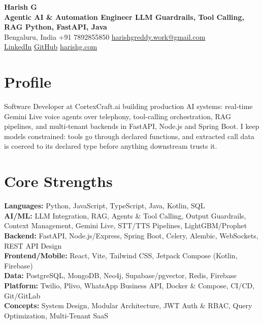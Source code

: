 \documentclass[10pt,a4paper]{article}
\begin{document}
{\LARGE\bfseries Harish G}\\[1pt]
{\normalsize\bfseries Agentic AI \& Automation Engineer \textbar{} LLM Guardrails, Tool Calling, RAG \textbar{} Python, FastAPI, Java}\\[2pt]
Bengaluru, India \quad\textbar\quad +91 7892855850 \quad\textbar\quad
\href{mailto:harishgreddy.work@gmail.com}{harishgreddy.work@gmail.com}\\[1pt]
\href{https://www.linkedin.com/in/harishgreddy/}{LinkedIn} \quad\textbar\quad \href{https://github.com/harish00506/}{GitHub} \quad\textbar\quad \href{https://www.harishg.com}{harishg.com}

\section{Profile}
Software Developer at CortexCraft.ai building production AI systems: real-time Gemini Live voice agents
over telephony, tool-calling orchestration, RAG pipelines, and multi-tenant backends in FastAPI, Node.js
and Spring Boot. I keep models constrained: tools go through declared functions, and extracted call data
is coerced to its declared type before anything downstream trusts it.

\section{Core Strengths}
\textbf{Languages:} Python, JavaScript, TypeScript, Java, Kotlin, SQL\\
\textbf{AI/ML:} LLM Integration, RAG, Agents \& Tool Calling, Output Guardrails, Context Management,
Gemini Live, STT/TTS Pipelines, LightGBM/Prophet\\
\textbf{Backend:} FastAPI, Node.js/Express, Spring Boot, Celery, Alembic, WebSockets, REST API Design\\
\textbf{Frontend/Mobile:} React, Vite, Tailwind CSS, Jetpack Compose (Kotlin, Firebase)\\
\textbf{Data:} PostgreSQL, MongoDB, Neo4j, Supabase/pgvector, Redis, Firebase\\
\textbf{Platform:} Twilio, Plivo, WhatsApp Business API, Docker \& Compose, CI/CD, Git/GitLab\\
\textbf{Concepts:} System Design, Modular Architecture, JWT Auth \& RBAC, Query Optimization, Multi-Tenant SaaS
\end{document}
